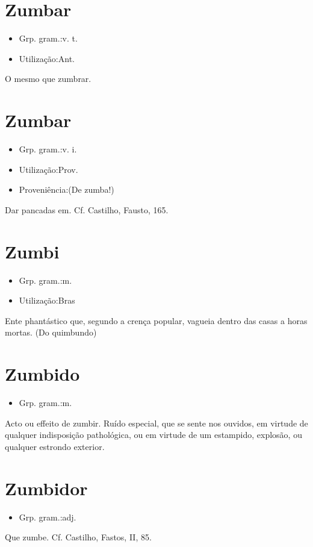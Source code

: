 \section{Zumbar}
\begin{itemize}
\item {Grp. gram.:v. t.}
\end{itemize}
\begin{itemize}
\item {Utilização:Ant.}
\end{itemize}
O mesmo que \textunderscore zumbrar\textunderscore .
\section{Zumbar}
\begin{itemize}
\item {Grp. gram.:v. i.}
\end{itemize}
\begin{itemize}
\item {Utilização:Prov.}
\end{itemize}
\begin{itemize}
\item {Proveniência:(De \textunderscore zumba\textunderscore !)}
\end{itemize}
Dar pancadas em. Cf. Castilho, \textunderscore Fausto\textunderscore , 165.
\section{Zumbi}
\begin{itemize}
\item {Grp. gram.:m.}
\end{itemize}
\begin{itemize}
\item {Utilização:Bras}
\end{itemize}
Ente phantástico que, segundo a crença popular, vagueia dentro das casas a horas mortas.
(Do quimbundo)
\section{Zumbido}
\begin{itemize}
\item {Grp. gram.:m.}
\end{itemize}
Acto ou effeito de zumbir.
Ruído especial, que se sente nos ouvidos, em virtude de qualquer indisposição pathológica, ou em virtude de um estampido, explosão, ou qualquer estrondo exterior.
\section{Zumbidor}
\begin{itemize}
\item {Grp. gram.:adj.}
\end{itemize}
Que zumbe. Cf. Castilho, \textunderscore Fastos\textunderscore , II, 85.
